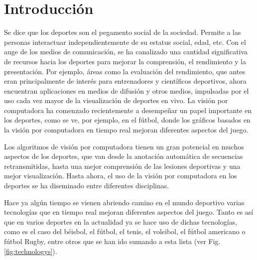 \chapter*{Introducción}\label{chapter:introduction}

Se dice que los deportes son el pegamento social de la sociedad. Permite a las personas interactuar independientemente de su estatus social, edad, etc. Con el auge de los medios de comunicación, se ha canalizado una cantidad significativa de recursos hacia los deportes para mejorar la comprensión, el rendimiento y la presentación. Por ejemplo, áreas como la evaluación del rendimiento, que antes eran principalmente de interés para entrenadores y científicos deportivos, ahora encuentran aplicaciones en medios de difusión y otros medios, impulsadas por el uso cada vez mayor de la visualización de deportes en vivo. La visión por computadora ha comenzado recientemente a desempeñar un papel importante en los deportes, como se ve, por ejemplo, en el fútbol, donde los gráficos basados en la visión por computadora en tiempo real mejoran diferentes aspectos del juego.

Los algoritmos de visión por computadora tienen un gran potencial en muchos aspectos de los deportes, que van desde la anotación automática de secuencias retransmitidas, hasta una mejor comprensión de las lesiones deportivas y una mejor visualización. Hasta ahora, el uso de la visión por computadora en los deportes se ha diseminado entre diferentes disciplinas.

Hace ya algún tiempo se vienen abriendo camino en el mundo deportivo varias tecnologías que en tiempo real mejoran diferentes aspectos del juego. Tanto es así que en varios deportes en la actualidad ya se hace uso de dichas tecnologías, como es el caso del béisbol, el fútbol, el tenis, el voleibol, el fútbol americano o fútbol Rugby, entre otros que se han ido sumando a esta lista (ver Fig. \ref{fig:technologys}).

